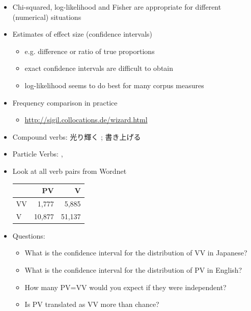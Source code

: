 \documentclass[a4paper,landscape,headrule,footrule,xetex]{foils}
\begin{document}
\begin{itemize}
\item Chi-squared, log-likelihood and Fisher are
appropriate for different (numerical) situations

\item Estimates of effect size (confidence intervals)
\begin{itemize}
\item e.g. difference or ratio of true proportions
\item exact confidence intervals are difficult to obtain
\item log-likelihood seems to do best for many corpus measures
\end{itemize}
\item Frequency comparison in practice
\begin{itemize}
\item \url{http://sigil.collocations.de/wizard.html}
\end{itemize}
\end{itemize}

\begin{itemize}
\item Compound verbs: 光り輝く ; 
  書き上げる 
\item Particle Verbs: , 
\item Look at all verb pairs from Wordnet \\
  \begin{tabular}{l|rr}
      & PV & V \\ \hline
   VV &  1,777 & 5,885 \\     
   V  &  10,877 & 51,137 
  \end{tabular}
\item Questions:
  \begin{itemize}
  \item What is the confidence interval for the distribution of VV in Japanese?
  \item What is the confidence interval for the distribution of PV in English?
  \item How many PV=VV would you expect if they were independent?
  \item Is PV translated as VV more than chance?
  \end{itemize}
\end{itemize}
\end{document}
